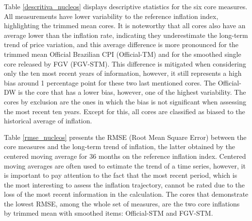 \documentclass[10pt]{article}
\begin{document}
Table \ref{descritiva_nucleos} displays descriptive statistics for the six core measures. All measurements have lower variability to the reference inflation index, highlighting the trimmed mean cores. It is noteworthy that all cores also have an average lower than the inflation rate, indicating they underestimate the long-term trend of price variation, and this average difference is more pronounced for the trimmed mean Official Brazilian CPI (Official-TM) and for the smoothed single core released by FGV (FGV-STM). This difference is mitigated when considering only the ten most recent years of information, however, it still represents a high bias around 1 percentage point for these two last mentioned cores. The Official-DW is the core that has a lower bias, however, one of the highest variability. The cores by exclusion are the ones in which the bias is not significant when assessing the most recent ten years. Except for this, all cores are classified as biased to the historical average of inflation.


Table \ref{rmse_nucleos} presents the RMSE (Root Mean Square Error) between the core measures and the long-term trend of inflation, the latter obtained by the centered moving average for 36 months on the reference inflation index. Centered moving averages are often used to estimate the trend of a time series, however, it is important to pay attention to the fact that the most recent period, which is the most interesting to assess the inflation trajectory, cannot be rated due to the loss of the most recent information in the calculation. The cores that demonstrate the lowest RMSE, among the whole set of measures, are the two core inflations by trimmed mean with smoothed items: Official-STM and FGV-STM.
\end{document}
